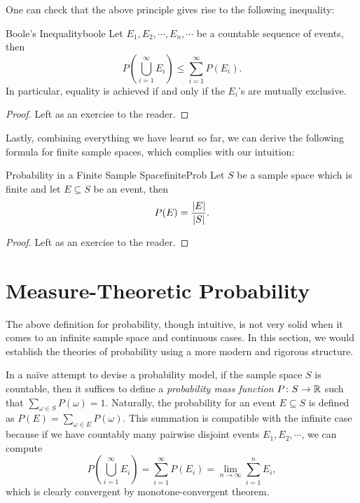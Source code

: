 \documentclass[math]{amznotes}
\theoremstyle{remark}
\newcommand{\0}{\mathbf{0}}
\newcommand{\1}{\mathbf{1}}
\begin{document}
One can check that the above principle gives rise to the following inequality:
\begin{thmbox}{Boole's Inequality}{boole}
    Let $E_1, E_2, \cdots, E_n, \cdots$ be a countable sequence of events, then
    \begin{equation*}
        P\left(\bigcup_{i = 1}^\infty E_i\right) \leq \sum_{i = 1}^{\infty}P(E_i).
    \end{equation*}
    In particular, equality is achieved if and only if the $E_i$'s are mutually exclusive.
    \tcblower
    \begin{proof}
        Left as an exercise to the reader.
    \end{proof}
\end{thmbox}
Lastly, combining everything we have learnt so far, we can derive the following formula for finite sample spaces, which complies with our intuition:
\begin{thmbox}{Probability in a Finite Sample Space}{finiteProb}
    Let $S$ be a sample space which is finite and let $E \subseteq S$ be an event, then 
    \begin{equation*}
        P(E) = \frac{{\left\lvert {E} \right\rvert}}{{\left\lvert {S} \right\rvert}}.
    \end{equation*}
    \tcblower
    \begin{proof}
        Left as an exercise to the reader.
    \end{proof}
\end{thmbox}
\section{Measure-Theoretic Probability}The above definition for probability, though intuitive, is not very solid when it comes to an infinite sample space and continuous cases. In this section, we would establish the theories of probability using a more modern and rigorous structure.

In a na\"{i}ve attempt to devise a probability model, if the sample space $S$ is countable, then it suffices to define a \textit{probability mass function} $P \colon S \to \mathbb{R}$ such that $\sum_{\omega \in S}P\left(\omega\right) = 1$. Naturally, the probability for an event $E \subseteq S$ is defined as $P\left(E\right) = \sum_{\omega \in E}P\left(\omega\right)$. This summation is compatible with the infinite case because if we have countably many pairwise disjoint events $E_1, E_2, \cdots$, we can compute 
\begin{equation*}
    P\left(\bigcup_{i = 1}^{\infty}E_i\right) = \sum_{i = 1}^{\infty}P\left(E_i\right) = \lim_{n \to \infty}\sum_{i = 1}^{n}E_i,
\end{equation*}
which is clearly convergent by monotone-convergent theorem.
\end{document}
